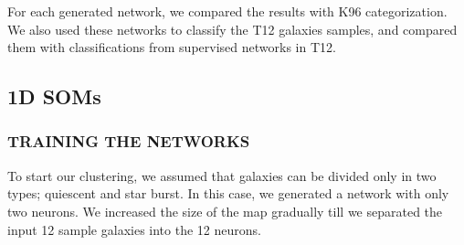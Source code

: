     For each generated network, we compared the results with K96 categorization.
    We also used these networks to classify the T12 galaxies samples, and compared them with classifications from supervised networks in T12.
    \subsection{1D SOMs}
    \label{sec: 1D}
        \subsubsection{TRAINING THE NETWORKS}
        \label{sec: 1Dt}
            To start our clustering, we assumed that galaxies can be divided only in two types; quiescent and star burst.
            In this case, we generated a network with only two neurons.
            We increased the size of the map gradually till we separated the input 12 sample galaxies into the 12 neurons. 
        
